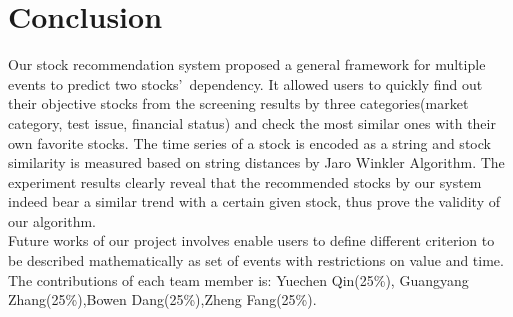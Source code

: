 \documentclass[10pt, conference, compsocconf]{IEEEtran}
\begin{document}
\section{Conclusion}
Our stock recommendation system proposed a general framework for multiple events to predict two stocks\rq\  dependency. It allowed users to quickly find out their objective stocks from the screening results by three categories(market category, test issue, financial status) and check the most similar ones with their own favorite stocks. The time series of a stock is encoded as a string and stock similarity is measured based on string distances by Jaro Winkler Algorithm. The experiment results clearly reveal that the recommended stocks by our system indeed bear a similar trend with a certain given stock, thus prove the validity of our algorithm. \\

Future works of our project involves enable users to define different criterion to be described mathematically as set of events with restrictions on value and time. The contributions of each team member is: Yuechen Qin(25\%), Guangyang Zhang(25\%),Bowen Dang(25\%),Zheng Fang(25\%).


%
%

\end{document}
